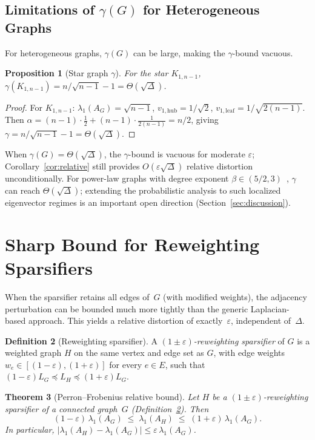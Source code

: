 \documentclass[11pt]{article}
\newtheorem{theorem}{Theorem}[section]
\newtheorem{proposition}[theorem]{Proposition}
\theoremstyle{definition}
\newtheorem{definition}[theorem]{Definition}
\newcommand{\eps}{\varepsilon}
\newcommand{\lamH}{\lambda_1(A_H)}
\newcommand{\lamG}{\lambda_1(A_G)}
\newcommand{\LG}{L_G}
\newcommand{\LH}{L_H}
\begin{document}
\subsection{Limitations of $\gamma(G)$ for Heterogeneous Graphs}

For heterogeneous graphs, $\gamma(G)$ can be large, making the $\gamma$-bound vacuous.

\begin{proposition}[Star graph $\gamma$]\label{prop:star-gamma}
For the star $K_{1,n-1}$,
$\gamma(K_{1,n-1}) = n/\sqrt{n-1} - 1 = \Theta(\sqrt{\Delta})$.
\end{proposition}
\begin{proof}
For $K_{1,n-1}$: $\lamG = \sqrt{n-1}$, $v_{1,\mathrm{hub}} = 1/\sqrt{2}$,
$v_{1,\mathrm{leaf}} = 1/\sqrt{2(n-1)}$. Then
$\alpha = (n-1) \cdot \tfrac{1}{2} + (n-1) \cdot \tfrac{1}{2(n-1)} = n/2$,
giving $\gamma = n/\sqrt{n-1} - 1 = \Theta(\sqrt{\Delta})$.
\end{proof}

When $\gamma(G) = \Theta(\sqrt{\Delta})$, the $\gamma$-bound is vacuous for moderate
$\eps$; Corollary~\ref{cor:relative} still provides $O(\eps\sqrt{\Delta})$ relative
distortion unconditionally. For power-law graphs with degree exponent
$\beta \in (5/2, 3)$~\citep{chung2003eigenvalues}, $\gamma$ can reach
$\Theta(\sqrt{\Delta})$; extending the probabilistic analysis to such localized
eigenvector regimes is an important open direction
(Section~\ref{sec:discussion}).


\section{Sharp Bound for Reweighting Sparsifiers}\label{sec:reweight}

When the sparsifier retains all edges of~$G$ (with modified weights), the adjacency
perturbation can be bounded much more tightly than the generic Laplacian-based
approach. This yields a relative distortion of exactly~$\eps$, independent of~$\Delta$.

\begin{definition}[Reweighting sparsifier]\label{def:reweight}
A \emph{$(1\pm\eps)$-reweighting sparsifier} of $G$ is a weighted graph $H$ on the same
vertex and edge set as $G$, with edge weights $w_e \in [(1-\eps), (1+\eps)]$ for every
$e \in E$, such that $(1-\eps)\LG \preceq \LH \preceq (1+\eps)\LG$.
\end{definition}

\begin{theorem}[Perron--Frobenius relative bound]\label{thm:pf-sharp}
Let $H$ be a $(1\pm\eps)$-reweighting sparsifier of a connected graph~$G$
(Definition~\ref{def:reweight}). Then
\[
(1-\eps)\,\lamG \;\leq\; \lamH \;\leq\; (1+\eps)\,\lamG.
\]
In particular, $|\lamH - \lamG| \leq \eps\,\lamG$.
\end{theorem}
\end{document}
